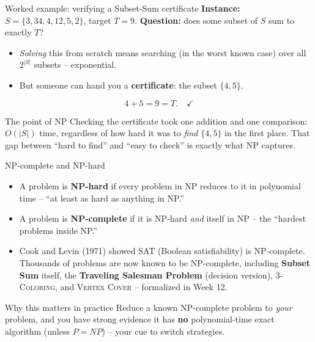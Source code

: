 \documentclass[11pt,aspectratio=169]{beamer}
\begin{document}
\begin{frame}{Worked example: verifying a Subset-Sum certificate}
  \textbf{Instance:} $S = \{3, 34, 4, 12, 5, 2\}$, target $T = 9$. \textbf{Question:}
  does some subset of $S$ sum to exactly $T$?
  \begin{itemize}
    \item \emph{Solving} this from scratch means searching (in the worst known case)
    over all $2^{|S|}$ subsets -- exponential.
    \item But someone can hand you a \textbf{certificate}: the subset $\{4, 5\}$.
  \end{itemize}
  \[
    4 + 5 = 9 = T. \quad \checkmark
  \]
  \begin{exampleblock}{The point of NP}
    Checking the certificate took one addition and one comparison: $O(|S|)$ time,
    regardless of how hard it was to \emph{find} $\{4,5\}$ in the first place. That gap
    between ``hard to find'' and ``easy to check'' is exactly what NP captures.
  \end{exampleblock}
\end{frame}

\begin{frame}{NP-complete and NP-hard}
  \begin{itemize}
    \item A problem is \textbf{NP-hard} if every problem in NP reduces to it in
    polynomial time -- ``at least as hard as anything in NP.''
    \item A problem is \textbf{NP-complete} if it is NP-hard \emph{and} itself in NP --
    the ``hardest problems inside NP.''
    \item Cook and Levin (1971) showed \textsc{SAT} (Boolean satisfiability) is
    NP-complete. Thousands of problems are now known to be NP-complete, including
    \textbf{Subset Sum} itself, the \textbf{Traveling Salesman Problem} (decision
    version), \textsc{3-Coloring}, and \textsc{Vertex Cover} -- formalized in Week 12.
  \end{itemize}
  \begin{exampleblock}{Why this matters in practice}
    Reduce a known NP-complete problem to \emph{your} problem, and you have strong
    evidence it has \textbf{no} polynomial-time exact algorithm (unless $P=NP$) -- your
    cue to switch strategies.
  \end{exampleblock}
\end{frame}
\end{document}
